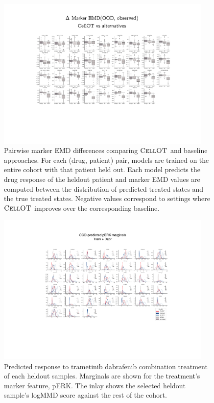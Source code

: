 \begin{figure}[h]
  \begin{center}
    \includegraphics[width=0.95\textwidth]{figures/cellot-cohort/ood-eval-marker.pdf}
  \end{center}
  \caption{
    Pairwise marker EMD differences comparing $\textsc{CellOT}$ and baseline approaches.
    For each (drug, patient) pair, models are trained on the entire cohort with that patient held out.
    Each model predicts the drug response of the heldout patient
    and marker EMD values are computed between the distribution of predicted treated states and the true treated states.
    Negative values correspond to settings where $\textsc{CellOT}$ improves over the corresponding baseline.
  }
  \label{fig:ood-eval-marker}
\end{figure}

\begin{figure}
  \begin{center}
    \includegraphics[width=0.95\textwidth]{figures/cellot-cohort/ood-predict-marginals.pdf}
  \end{center}
  \caption{
    Predicted response to trametinib dabrafenib combination treatment of each heldout samples.
    Marginals are shown for the treatment's marker feature, pERK.
    The inlay shows the selected heldout sample's logMMD score against the rest of the cohort.
  }\label{fig:ood-predict-marginals}
\end{figure}

